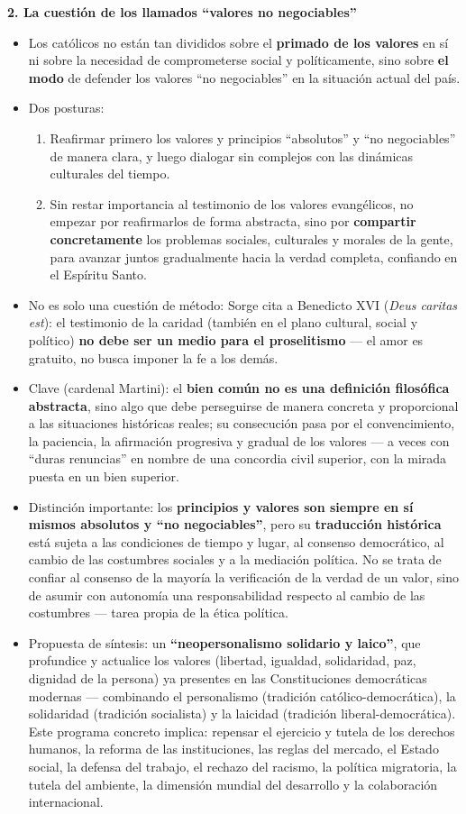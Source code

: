 \documentclass[10pt,a4paper]{article}
\begin{document}
\medskip\noindent \textbf{2. La cuestión de los llamados ``valores no negociables''}\par\nopagebreak
\begin{itemize}
\item Los católicos no están tan divididos sobre el \textbf{primado de los valores} en sí ni sobre la necesidad de comprometerse social y políticamente, sino sobre \textbf{el modo} de defender los valores ``no negociables'' en la situación actual del país.
\item Dos posturas:
\begin{enumerate}
\item Reafirmar primero los valores y principios ``absolutos'' y ``no negociables'' de manera clara, y luego dialogar sin complejos con las dinámicas culturales del tiempo.
\item Sin restar importancia al testimonio de los valores evangélicos, no empezar por reafirmarlos de forma abstracta, sino por \textbf{compartir concretamente} los problemas sociales, culturales y morales de la gente, para avanzar juntos gradualmente hacia la verdad completa, confiando en el Espíritu Santo.
\end{enumerate}
\item No es solo una cuestión de método: Sorge cita a Benedicto XVI (\textit{Deus caritas est}): el testimonio de la caridad (también en el plano cultural, social y político) \textbf{no debe ser un medio para el proselitismo} --- el amor es gratuito, no busca imponer la fe a los demás.
\item Clave (cardenal Martini): el \textbf{bien común no es una definición filosófica abstracta}, sino algo que debe perseguirse de manera concreta y proporcional a las situaciones históricas reales; su consecución pasa por el convencimiento, la paciencia, la afirmación progresiva y gradual de los valores --- a veces con ``duras renuncias'' en nombre de una concordia civil superior, con la mirada puesta en un bien superior.
\item Distinción importante: los \textbf{principios y valores son siempre en sí mismos absolutos y ``no negociables''}, pero su \textbf{traducción histórica} está sujeta a las condiciones de tiempo y lugar, al consenso democrático, al cambio de las costumbres sociales y a la mediación política. No se trata de confiar al consenso de la mayoría la verificación de la verdad de un valor, sino de asumir con autonomía una responsabilidad respecto al cambio de las costumbres --- tarea propia de la ética política.
\item Propuesta de síntesis: un \textbf{``neopersonalismo solidario y laico''}, que profundice y actualice los valores (libertad, igualdad, solidaridad, paz, dignidad de la persona) ya presentes en las Constituciones democráticas modernas --- combinando el personalismo (tradición católico-democrática), la solidaridad (tradición socialista) y la laicidad (tradición liberal-democrática). Este programa concreto implica: repensar el ejercicio y tutela de los derechos humanos, la reforma de las instituciones, las reglas del mercado, el Estado social, la defensa del trabajo, el rechazo del racismo, la política migratoria, la tutela del ambiente, la dimensión mundial del desarrollo y la colaboración internacional.

\end{itemize}
\end{document}

